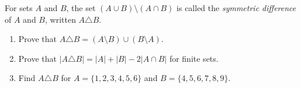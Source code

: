 For sets $A$ and $B$, the set $(A\cup B)\setminus(A\cap B)$ is called the \emph{symmetric difference} of $A$ and $B$, written $A\triangle B$.
\begin{enumerate}
\item[(a)] Prove that $A\triangle B=(A\setminus B)\cup(B\setminus A)$.
\item[(b)] Prove that $|A\triangle B|=|A|+|B|-2|A\cap B|$ for finite sets.
\item[(c)] Find $A\triangle B$ for $A=\{1,2,3,4,5,6\}$ and $B=\{4,5,6,7,8,9\}$.
\end{enumerate}
